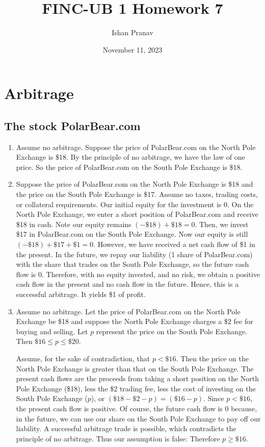 \documentclass[12pt]{article}
\title{FINC-UB 1 Homework 7}
\author{Ishan Pranav}
\date{November 11, 2023}
\begin{document}
\maketitle
\section{Arbitrage}
\subsection{The stock PolarBear.com}
\begin{enumerate}
\item Assume no arbitrage. Suppose the price of PolarBear.com on the North Pole Exchange is \$18. By the principle of no arbitrage, we have the law of one price. So the price of PolarBear.com on the South Pole Exchange is \$18.
\item Suppose the price of PolarBear.com on the North Pole Exchange is \$18 and the price on the South Pole Exchange is \$17. Assume no taxes, trading costs, or collateral requirements. Our initial equity for the investment is 0. On the North Pole Exchange, we enter a short position of PolarBear.com and receive \$18 in cash. Note our equity remains $(-\$18)+\$18=0$. Then, we invest \$17 in PolarBear.com on the South Pole Exchange. Now our equity is still $(-\$18)+\$17+\$1=0$. However, we have received a net cash flow of \$1 in the present. In the future, we repay our liability (1 share of PolarBear.com) with the share that trades on the South Pole Exchange, so the future cash flow is 0. Therefore, with no equity invested, and no risk, we obtain a positive cash flow in the present and no cash flow in the future. Hence, this is a successful arbitrage. It yields \$1 of profit.
\item Assume no arbitrage. Let the price of PolarBear.com on the North Pole Exchange be \$18 and suppose the North Pole Exchange charges a \$2 fee for buying and selling. Let $p$ represent the price on the South Pole Exchange. Then $\$16\leq p\leq\$20$. 

Assume, for the sake of contradiction, that $p<\$16$. Then the price on the North Pole Exchange is greater than that on the South Pole Exchange. The present cash flows are the proceeds from taking a short position on the North Pole Exchange (\$18), less the \$2 trading fee, less the cost of investing on the South Pole Exchange ($p$), or $(\$18-\$2-p)=(\$16-p)$. Since $p<\$16$, the present cash flow is positive. Of course, the future cash flow is 0 because, in the future, we can use our share on the South Pole Exchange to pay off our liability. A successful arbitrage trade is possible, which contradicts the principle of no arbitrage. Thus our assumption is false: Therefore $p\geq\$16$.


\end{enumerate}
\end{document}
